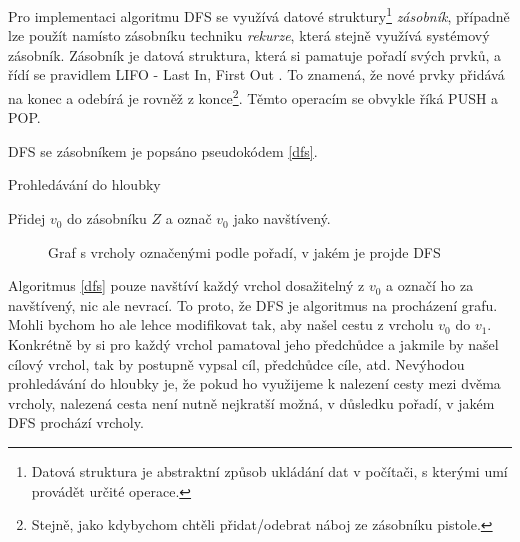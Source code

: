 \documentclass[12pt]{report}			%
\begin{document}
Pro implementaci algoritmu DFS se využívá datové struktury\footnote{Datová struktura je abstraktní způsob ukládání dat v počítači, s kterými umí provádět určité operace.} \emph{zásobník}, případně lze použít namísto zásobníku techniku \emph{rekurze}, která stejně využívá systémový zásobník. Zásobník je datová struktura, která si pamatuje pořadí svých prvků, a řídí se pravidlem LIFO - Last In, First Out%
. To znamená, že nové prvky přidává na konec a odebírá je rovněž z konce\footnote{Stejně, jako kdybychom chtěli přidat/odebrat náboj ze zásobníku pistole.}. Těmto operacím se obvykle říká PUSH a POP.

DFS se zásobníkem je popsáno pseudokódem \ref{dfs}.
\begin{algorithm}

			    \caption{Prohledávání do hloubky}
			    \label{dfs}
  				Přidej $v_0$ do zásobníku $Z$ a označ $v_0$ jako navštívený.
  				
				
				
				\end{algorithm}
\begin{figure}[h]
\begin{center}
\caption{Graf s vrcholy označenými podle pořadí, v jakém je projde DFS} \label{grafDFS}
\end{center}
\end{figure}
			Algoritmus \ref{dfs} pouze navštíví každý vrchol dosažitelný z $v_0$ a označí ho za navštívený, nic ale nevrací. To proto, že DFS je algoritmus na procházení grafu. Mohli bychom ho ale lehce modifikovat tak, aby našel cestu z vrcholu $v_0$ do $v_1$. Konkrétně by si pro každý vrchol pamatoval jeho předchůdce a jakmile by našel cílový vrchol, tak by postupně vypsal cíl, předchůdce cíle, atd. Nevýhodou prohledávání do hloubky je, že pokud ho využijeme k nalezení cesty mezi dvěma vrcholy, nalezená cesta není nutně nejkratší možná, v důsledku pořadí, v jakém DFS prochází vrcholy.
			
\end{document}
